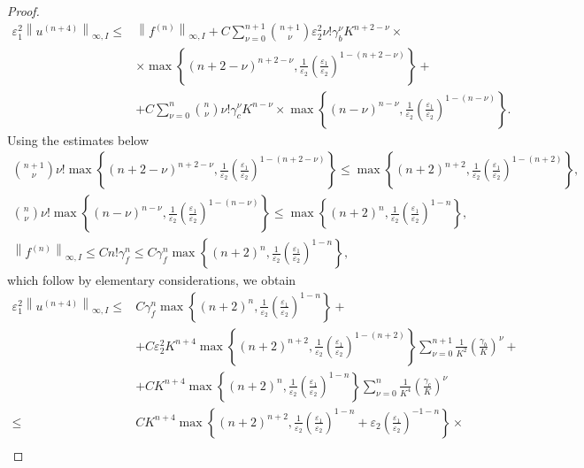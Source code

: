 \documentclass[12pt]{article}
\begin{document}
\begin{proof}
$$
\begin{aligned}
\varepsilon_1^2\left\|u^{(n+4)}\right\|_{\infty, I} \leq & \left\|f^{(n)}\right\|_{\infty, I}+ C \sum_{\nu=0}^{n+1}\binom{n+1}{\nu} \varepsilon_2^2 \nu!\gamma_b^\nu K^{n+2-\nu} \times \\
& \times \max \left\{(n+2-\nu)^{n+2-\nu}, \frac{1}{\varepsilon_2}\left(\frac{\varepsilon_1}{\varepsilon_2}\right)^{1-(n+2-\nu)}\right\}+ \\
& +C \sum_{\nu=0}^n\binom{n}{\nu} \nu!\gamma_c^\nu K^{n-\nu} \times \max \left\{(n-\nu)^{n-\nu}, \frac{1}{\varepsilon_2}\left(\frac{\varepsilon_1}{\varepsilon_2}\right)^{1-(n-\nu)}\right\} .
\end{aligned}
$$
%
Using the estimates below
%
$$
\begin{gathered}
\binom{n+1}{\nu} \nu!\max \left\{(n+2-\nu)^{n+2-\nu}, \frac{1}{\varepsilon_2}\left(\frac{\varepsilon_1}{\varepsilon_2}\right)^{1-(n+2-\nu)}\right\} \leq
 \max \left\{(n+2)^{n+2}, \frac{1}{\varepsilon_2}\left(\frac{\varepsilon_1}{\varepsilon_2}\right)^{1-(n+2)}\right\}, \\
\binom{n}{\nu} \nu!\max \left\{(n-\nu)^{n-\nu}, \frac{1}{\varepsilon_2}\left(\frac{\varepsilon_1}{\varepsilon_2}\right)^{1-(n-\nu)}\right\} \leq \max \left\{(n+2)^n, \frac{1}{\varepsilon_2}\left(\frac{\varepsilon_1}{\varepsilon_2}\right)^{1-n}\right\}, \\
\left\|f^{(n)}\right\|_{\infty, I} \leq C n!\gamma_f^n \leq C \gamma_f^n \max \left\{(n+2)^n, \frac{1}{\varepsilon_2}\left(\frac{\varepsilon_1}{\varepsilon_2}\right)^{1-n}\right\},
\end{gathered}
$$
%
which follow by elementary considerations, we obtain
%
$$
\begin{aligned}
\varepsilon_1^2\left\|u^{(n+4)}\right\|_{\infty, I} \leq & C \gamma_f^n \max \left\{(n+2)^n, \frac{1}{\varepsilon_2}\left(\frac{\varepsilon_1}{\varepsilon_2}\right)^{1-n}\right\}+ \\
& +C \varepsilon_2^2 K^{n+4} \max \left\{(n+2)^{n+2}, \frac{1}{\varepsilon_2}\left(\frac{\varepsilon_1}{\varepsilon_2}\right)^{1-(n+2)}\right\} \sum_{\nu=0}^{n+1} \frac{1}{K^2}\left(\frac{\gamma_b}{K}\right)^\nu+ \\
& +C K^{n+4} \max \left\{(n+2)^n, \frac{1}{\varepsilon_2}\left(\frac{\varepsilon_1}{\varepsilon_2}\right)^{1-n}\right\} \sum_{\nu=0}^n \frac{1}{K^4}\left(\frac{\gamma_c}{K}\right)^\nu \\
\leq & C K^{n+4} \max \left\{(n+2)^{n+2}, \frac{1}{\varepsilon_2}\left(\frac{\varepsilon_1}{\varepsilon_2}\right)^{1-n}+\varepsilon_2\left(\frac{\varepsilon_1}{\varepsilon_2}\right)^{-1-n}\right\} \times \\

\end{aligned}$$
\end{proof}
\end{document}
